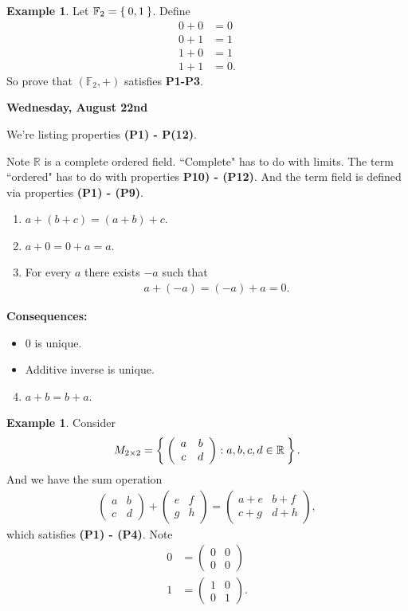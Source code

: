 \documentclass[12pt]{amsbook}
\theoremstyle{plain}
\numberwithin{section}{chapter}
\numberwithin{equation}{chapter}
\theoremstyle{definition}
\newtheorem{Ex}[theorem]{Example}
\theoremstyle{remark}
\theoremstyle{plain}
\newcommand{\R}{\mathbb{R}}
\newcommand{\F}{\mathbb{F}}
\newcommand{\bee}{\begin{equation}\begin{aligned}}
\newcommand{\eee}{\end{aligned}\end{equation}}
\newcommand{\lpar}{\left(}
\newcommand{\rpar}{\right)}
\begin{document}
\begin{Ex}
Let $\F_2 = \Set{0,1}$. Define
\bee
0 + 0 &= 0\\
0 + 1 &= 1\\
1 + 0 &= 1\\
1 + 1 &= 0.
\eee
So prove that $(\F_2, +)$ satisfies \textbf{P1-P3}. 
\end{Ex}

\textbf{Wednesday, August 22nd}

We're listing properties \textbf{(P1) - P(12)}. 

Note $\R$ is a complete ordered field. ``Complete" has to do with limits. The term ``ordered" has to do with properties \textbf{P10) - (P12)}. And the term field is defined via properties \textbf{(P1) - (P9)}. 

\begin{enumerate}[label=(\textbf{P\arabic*)}]
\item $a + (b + c) = (a + b) + c$.
\item $a + 0 = 0 + a = a$. 
\item For every $a$ there exists $-a$ such that
\bee
a + (-a) = (-a) + a = 0. 
\eee
\end{enumerate}

\textbf{Consequences: } 
\begin{itemize}
\item $0$ is unique. 
\item Additive inverse is unique. 
\end{itemize}


\begin{enumerate}[label=(\textbf{P\arabic*)}]
\setcounter{enumi}{3}
\item $a + b = b + a$. 
\end{enumerate}

\begin{Ex}
Consider
\bee
M_{2 \times 2} = \Set{\lpar 
\begin{array}{cc}
a & b\\
c & d
\end{array} \rpar : a,b,c,d \in \R}.
\eee
And we have the sum operation
\bee
\lpar 
\begin{array}{cc}
a & b\\
c & d
\end{array} \rpar + \lpar 
\begin{array}{cc}
e & f\\
g & h
\end{array} \rpar = 
\lpar 
\begin{array}{cc}
a + e & b + f\\
c + g & d + h
\end{array} \rpar,
\eee
which satisfies \textbf{(P1) - (P4)}. Note 
\bee
0 &= \lpar 
\begin{array}{cc}
0 & 0\\
0 & 0
\end{array} \rpar\\
1 &= \lpar 
\begin{array}{cc}
1 & 0\\
0 & 1
\end{array} \rpar.
\eee
\end{Ex}
\end{document}
